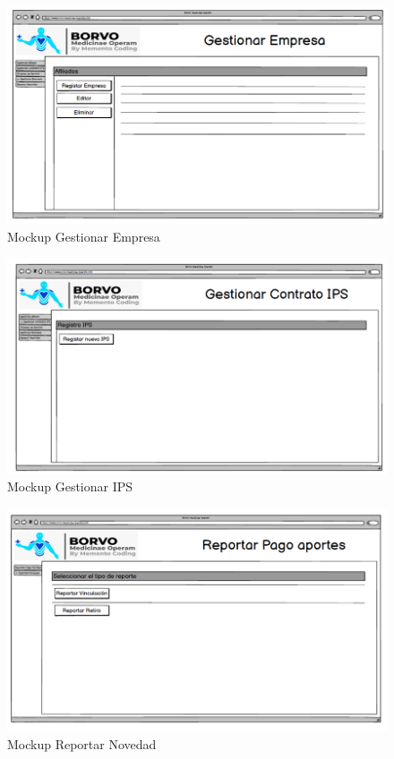 \documentclass[12pt,a4paper]{article}
\begin{document}
\begin{figure}[H]
\centering
{\includegraphics[width=1\textwidth]{Mockup_10.png}\par}
\caption{Mockup Gestionar Empresa}
\end{figure}
\begin{figure}[H]
\centering
{\includegraphics[width=1\textwidth]{Mockup_11.png}\par}
\caption{Mockup Gestionar IPS}
\end{figure}
\begin{figure}[H]
\centering
{\includegraphics[width=1\textwidth]{Mockup_12.png}\par}
\caption{Mockup Reportar Novedad}
\end{figure}
\end{document}
